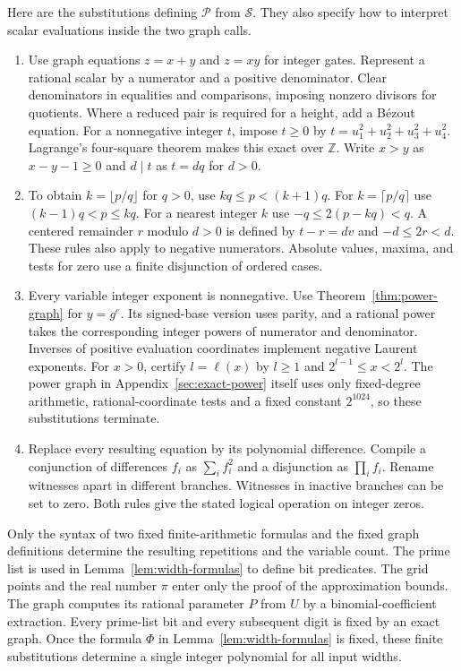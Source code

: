 \documentclass[11pt,letterpaper]{article}
\numberwithin{equation}{section}
\newcommand{\ZZ}{\mathbb Z}
\begin{document}
Here are the substitutions defining $\mathcal P$ from $\mathcal S$. They also specify how to interpret scalar evaluations inside the two graph calls.
\begin{enumerate}
\item Use graph equations $z=x+y$ and $z=xy$ for integer gates. Represent a rational scalar by a numerator and a positive denominator. Clear denominators in equalities and comparisons, imposing nonzero divisors for quotients. Where a reduced pair is required for a height, add a B\'ezout equation. For a nonnegative integer $t$, impose $t\ge0$ by $t=u_1^2+u_2^2+u_3^2+u_4^2$. Lagrange's four-square theorem makes this exact over $\ZZ$. Write $x>y$ as $x-y-1\ge0$ and $d\mid t$ as $t=dq$ for $d>0$.
\item To obtain $k=\lfloor p/q\rfloor$ for $q>0$, use $kq\le p<(k+1)q$. For $k=\lceil p/q\rceil$ use $(k-1)q<p\le kq$. For a nearest integer $k$ use $-q\le 2(p-kq)<q$. A centered remainder $r$ modulo $d>0$ is defined by $t-r=dv$ and $-d\le2r<d$. These rules also apply to negative numerators. Absolute values, maxima, and tests for zero use a finite disjunction of ordered cases.
\item Every variable integer exponent is nonnegative. Use Theorem~\ref{thm:power-graph} for $y=g^e$. Its signed-base version uses parity, and a rational power takes the corresponding integer powers of numerator and denominator. Inverses of positive evaluation coordinates implement negative Laurent exponents. For $x>0$, certify $l=\ell(x)$ by $l\ge1$ and $2^{l-1}\le x<2^l$. The power graph in Appendix~\ref{sec:exact-power} itself uses only fixed-degree arithmetic, rational-coordinate tests and a fixed constant $2^{1024}$, so these substitutions terminate.
\item Replace every resulting equation by its polynomial difference. Compile a conjunction of differences $f_i$ as $\sum_i f_i^2$ and a disjunction as $\prod_i f_i$. Rename witnesses apart in different branches. Witnesses in inactive branches can be set to zero. Both rules give the stated logical operation on integer zeros.
\end{enumerate}

Only the syntax of two fixed finite-arithmetic formulas and the fixed graph definitions determine the resulting repetitions and the variable count. The prime list is used in Lemma~\ref{lem:width-formulas} to define bit predicates. The grid points and the real number $\pi$ enter only the proof of the approximation bounds. The graph computes its rational parameter $P$ from $U$ by a binomial-coefficient extraction. Every prime-list bit and every subsequent digit is fixed by an exact graph. Once the formula $\Phi$ in Lemma~\ref{lem:width-formulas} is fixed, these finite substitutions determine a single integer polynomial for all input widths.
\end{document}
